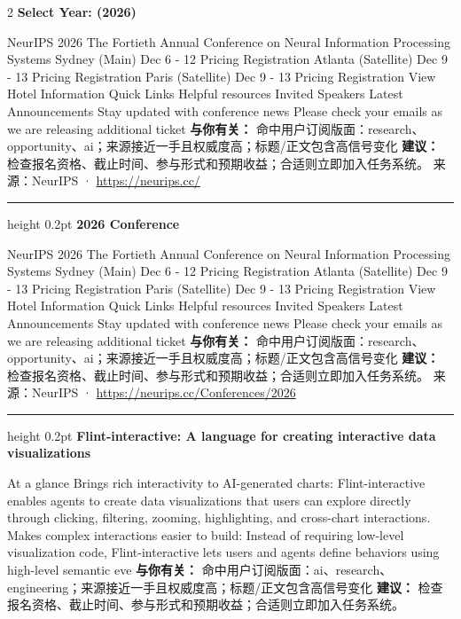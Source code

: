 \documentclass[10.5pt]{ctexart}
\begin{document}
\begin{multicols}{2}
{\large\bfseries Select Year: (2026)}\par
NeurIPS 2026 The Fortieth Annual Conference on Neural Information Processing Systems Sydney (Main) Dec 6 - 12 Pricing Registration Atlanta (Satellite) Dec 9 - 13 Pricing Registration Paris (Satellite) Dec 9 - 13 Pricing Registration View Hotel Information Quick Links Helpful resources Invited Speakers Latest Announcements Stay updated with conference news Please check your emails as we are releasing additional ticket
\textbf{与你有关：} 命中用户订阅版面：research、opportunity、ai；来源接近一手且权威度高；标题/正文包含高信号变化
\textbf{建议：} 检查报名资格、截止时间、参与形式和预期收益；合适则立即加入任务系统。
{\footnotesize\color{ormuted} 来源：NeurIPS · \url{https://neurips.cc/}}
\vspace{2mm}
\hrule height 0.2pt
\vspace{2mm}
{\large\bfseries 2026 Conference}\par
NeurIPS 2026 The Fortieth Annual Conference on Neural Information Processing Systems Sydney (Main) Dec 6 - 12 Pricing Registration Atlanta (Satellite) Dec 9 - 13 Pricing Registration Paris (Satellite) Dec 9 - 13 Pricing Registration View Hotel Information Quick Links Helpful resources Invited Speakers Latest Announcements Stay updated with conference news Please check your emails as we are releasing additional ticket
\textbf{与你有关：} 命中用户订阅版面：research、opportunity、ai；来源接近一手且权威度高；标题/正文包含高信号变化
\textbf{建议：} 检查报名资格、截止时间、参与形式和预期收益；合适则立即加入任务系统。
{\footnotesize\color{ormuted} 来源：NeurIPS · \url{https://neurips.cc/Conferences/2026}}
\vspace{2mm}
\hrule height 0.2pt
\vspace{2mm}
{\large\bfseries Flint-interactive: A language for creating interactive data visualizations}\par
At a glance Brings rich interactivity to AI-generated charts: Flint-interactive enables agents to create data visualizations that users can explore directly through clicking, filtering, zooming, highlighting, and cross-chart interactions. Makes complex interactions easier to build: Instead of requiring low-level visualization code, Flint-interactive lets users and agents define behaviors using high-level semantic eve
\textbf{与你有关：} 命中用户订阅版面：ai、research、engineering；来源接近一手且权威度高；标题/正文包含高信号变化
\textbf{建议：} 检查报名资格、截止时间、参与形式和预期收益；合适则立即加入任务系统。

\end{multicols}
\end{document}
